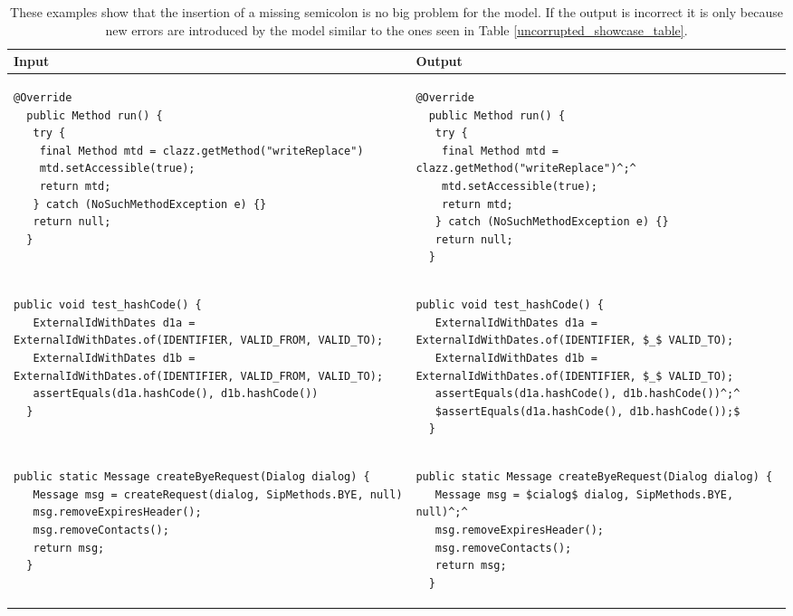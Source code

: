 \begin{landscape}
\begin{table}[p]
\begin{tabular}{ | m{10cm} | m{10cm} | }
  \hline
  Input & Output \\
  \hline
  {\begin{lstlisting}[style=table]
  @Override
  public Method run() {
   try {
    final Method mtd = clazz.getMethod("writeReplace")
    mtd.setAccessible(true);
    return mtd;
   } catch (NoSuchMethodException e) {}
   return null;
  }
  \end{lstlisting}} &
  {\begin{lstlisting}[style=table]
  @Override
  public Method run() {
   try {
    final Method mtd = clazz.getMethod("writeReplace")^;^
    mtd.setAccessible(true);
    return mtd;
   } catch (NoSuchMethodException e) {}
   return null;
  }
  \end{lstlisting}} \\
  \hline
  {\begin{lstlisting}[style=table]
  public void test_hashCode() {
   ExternalIdWithDates d1a = ExternalIdWithDates.of(IDENTIFIER, VALID_FROM, VALID_TO);
   ExternalIdWithDates d1b = ExternalIdWithDates.of(IDENTIFIER, VALID_FROM, VALID_TO);
   assertEquals(d1a.hashCode(), d1b.hashCode())
  }
  \end{lstlisting}} &
  {\begin{lstlisting}[style=table]
  public void test_hashCode() {
   ExternalIdWithDates d1a = ExternalIdWithDates.of(IDENTIFIER, $_$ VALID_TO);
   ExternalIdWithDates d1b = ExternalIdWithDates.of(IDENTIFIER, $_$ VALID_TO);
   assertEquals(d1a.hashCode(), d1b.hashCode())^;^
   $assertEquals(d1a.hashCode(), d1b.hashCode());$
  }
  \end{lstlisting}} \\
  \hline
  {\begin{lstlisting}[style=table]
  public static Message createByeRequest(Dialog dialog) {
   Message msg = createRequest(dialog, SipMethods.BYE, null)
   msg.removeExpiresHeader();
   msg.removeContacts();
   return msg;
  }
  \end{lstlisting}} &
  {\begin{lstlisting}[style=table]
  public static Message createByeRequest(Dialog dialog) {
   Message msg = $cialog$ dialog, SipMethods.BYE, null)^;^
   msg.removeExpiresHeader();
   msg.removeContacts();
   return msg;
  }
  \end{lstlisting}} \\
  \hline
\end{tabular}
\caption{These examples show that the insertion of a missing semicolon is no big problem for the model. If the output is incorrect it is only because new errors are introduced by the model similar to the ones seen in Table \ref{uncorrupted_showcase_table}.}
\label{semicolon_showcase_table}
\end{table}


\end{landscape}
